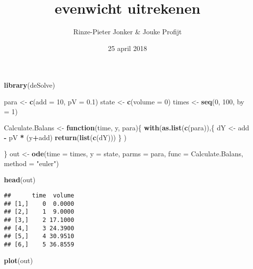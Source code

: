 \documentclass[]{article}
\title{evenwicht uitrekenen}
\author{Rinze-Pieter Jonker \& Jouke Profijt}
\date{25 april 2018}
\newenvironment{Shaded}{\begin{snugshade}}{\end{snugshade}}
\newcommand{\KeywordTok}[1]{\textcolor[rgb]{0.13,0.29,0.53}{\textbf{#1}}}
\newcommand{\DataTypeTok}[1]{\textcolor[rgb]{0.13,0.29,0.53}{#1}}
\newcommand{\DecValTok}[1]{\textcolor[rgb]{0.00,0.00,0.81}{#1}}
\newcommand{\FloatTok}[1]{\textcolor[rgb]{0.00,0.00,0.81}{#1}}
\newcommand{\StringTok}[1]{\textcolor[rgb]{0.31,0.60,0.02}{#1}}
\newcommand{\ControlFlowTok}[1]{\textcolor[rgb]{0.13,0.29,0.53}{\textbf{#1}}}
\newcommand{\OperatorTok}[1]{\textcolor[rgb]{0.81,0.36,0.00}{\textbf{#1}}}
\newcommand{\NormalTok}[1]{#1}
\begin{document}
\maketitle

\begin{Shaded}
\begin{Highlighting}[]
\KeywordTok{library}\NormalTok{(deSolve)}

\NormalTok{para <-}\StringTok{ }\KeywordTok{c}\NormalTok{(}\DataTypeTok{add =} \DecValTok{10}\NormalTok{, }\DataTypeTok{pV =} \FloatTok{0.1}\NormalTok{)}
\NormalTok{state <-}\StringTok{ }\KeywordTok{c}\NormalTok{(}\DataTypeTok{volume =} \DecValTok{0}\NormalTok{)}
\NormalTok{times <-}\StringTok{ }\KeywordTok{seq}\NormalTok{(}\DecValTok{0}\NormalTok{, }\DecValTok{100}\NormalTok{,  }\DataTypeTok{by =} \DecValTok{1}\NormalTok{)}

\NormalTok{Calculate.Balans <-}\StringTok{ }\ControlFlowTok{function}\NormalTok{(time, y, para)\{}
 \KeywordTok{with}\NormalTok{(}\KeywordTok{as.list}\NormalTok{(}\KeywordTok{c}\NormalTok{(para)),\{}
\NormalTok{         dY <-}\StringTok{ }\NormalTok{add }\OperatorTok{-}\StringTok{ }\NormalTok{pV }\OperatorTok{*}\StringTok{ }\NormalTok{(y}\OperatorTok{+}\NormalTok{add)}
         \KeywordTok{return}\NormalTok{(}\KeywordTok{list}\NormalTok{(}\KeywordTok{c}\NormalTok{(dY)))}
\NormalTok{       \}}
\NormalTok{       )}
  
\NormalTok{\}}
\NormalTok{out <-}\StringTok{ }\KeywordTok{ode}\NormalTok{(}\DataTypeTok{time =}\NormalTok{ times,}
           \DataTypeTok{y =}\NormalTok{ state,}
           \DataTypeTok{parms =}\NormalTok{ para,}
           \DataTypeTok{func =}\NormalTok{ Calculate.Balans,}
           \DataTypeTok{method =} \StringTok{"euler"}\NormalTok{)}

\KeywordTok{head}\NormalTok{(out)}
\end{Highlighting}
\end{Shaded}

\begin{verbatim}
##      time  volume
## [1,]    0  0.0000
## [2,]    1  9.0000
## [3,]    2 17.1000
## [4,]    3 24.3900
## [5,]    4 30.9510
## [6,]    5 36.8559
\end{verbatim}

\begin{Shaded}
\begin{Highlighting}[]
\KeywordTok{plot}\NormalTok{(out)}
\end{Highlighting}
\end{Shaded}
\end{document}
